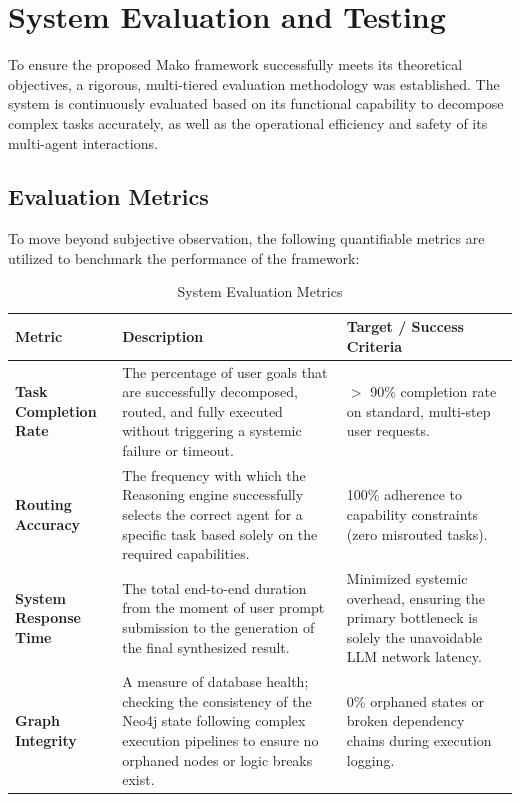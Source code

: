\section{System Evaluation and Testing}
To ensure the proposed Mako framework successfully meets its theoretical objectives, a rigorous, multi-tiered evaluation methodology was established. The system is continuously evaluated based on its functional capability to decompose complex tasks accurately, as well as the operational efficiency and safety of its multi-agent interactions.

\subsection{Evaluation Metrics}
To move beyond subjective observation, the following quantifiable metrics are utilized to benchmark the performance of the framework:

\begin{table}[ht!]
    \centering
    \caption{System Evaluation Metrics}
    \label{tab:evaluation_metrics}
    \begin{tabular}{|p{}|p{}|p{}|}
        \hline
        \textbf{Metric} & \textbf{Description} & \textbf{Target / Success Criteria} \\
        \hline
        \textbf{Task Completion Rate} & The percentage of user goals that are successfully decomposed, routed, and fully executed without triggering a systemic failure or timeout. & $>$ 90\% completion rate on standard, multi-step user requests. \\
        \hline
        \textbf{Routing Accuracy} & The frequency with which the Reasoning engine successfully selects the correct agent for a specific task based solely on the required capabilities. & 100\% adherence to capability constraints (zero misrouted tasks). \\
        \hline
        \textbf{System Response Time} & The total end-to-end duration from the moment of user prompt submission to the generation of the final synthesized result. & Minimized systemic overhead, ensuring the primary bottleneck is solely the unavoidable LLM network latency. \\
        \hline
        \textbf{Graph Integrity} & A measure of database health; checking the consistency of the Neo4j state following complex execution pipelines to ensure no orphaned nodes or logic breaks exist. & 0\% orphaned states or broken dependency chains during execution logging. \\
        \hline
    \end{tabular}
\end{table}

